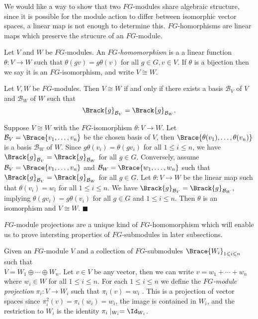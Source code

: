 \documentclass[../Project.tex]{subfiles}
\begin{document}
We would like a way to show that two $FG$-modules share algebraic structure, since it is possible for the module action to differ between isomorphic vector spaces, a linear map is not enough to determine this. $FG$-homorphisms are linear maps which preserve the strucure of an $FG$-module.
\begin{defi}
	Let  $V$ and $W$ be $FG$-modules. An \textit{$FG$-homomorphism} is a a linear function $\theta : V \to W$ such that $\theta(gv) = g\theta(v)$ for all $g \in G, v \in V$. If $\theta$ is a bijection then we say it is an $FG$-isomorphism, and write $V \cong W$.
\end{defi}


\begin{prop}[{\cite[Fact 7.7]{2}}]
\label{6}
Let $V,W$ be $FG$-modules. Then $V \cong W$ if and only if there exists a basis $\mathcal{B}_V$ of $V$ and $\mathcal{B}_W$ of $W$ such that
$$\Brack{g}_{\mathcal{B}_V} = \Brack{g}_{\mathcal{B}_W}.$$
\end{prop}
\begin{proo*}[{\cite[Fact 7.7]{2}}]
	Suppose $V \cong W$ with the $FG$-isomorphism $\theta : V \to W$. Let $\mathcal{B}_V = \Brace{v_1,\dots,v_n}$ be the chosen basis of $V$, then $\Brace{\theta(v_1),\dots,\theta(v_n)}$ is a basis $\mathcal{B}_W$ of $W$. Since $g\theta(v_i) = \theta(gv_i)$ for all $1 \leqslant i \leqslant n$, we have $\Brack{g}_{\mathcal{B}_V} = \Brack{g}_{\mathcal{B}_W}$ for all $g \in G$.  Conversely, assume $\mathcal{B}_V = \Brace{v_1,\dots,v_n}$ and $\mathcal{B}_W = \Brace{w_1,\dots,w_n}$ such that  $\Brack{g}_{\mathcal{B}_V} = \Brack{g}_{\mathcal{B}_W}$ for all $g \in G$. Let $\theta : V \to W$ be the linear map such that $\theta(v_i) = w_i$ for all $1 \leqslant i \leqslant n$. We have $\Brack{g}_{\mathcal{B}_V} = \Brack{g}_{\mathcal{B}_W}$, implying $\theta(gv_i) = g \theta(v_i)$ for all $g \in G$ and $1 \leqslant i \leqslant n$. Then $\theta$ is an isomorphism and $V \cong W$. \hfill$\blacksquare$
\end{proo*}

$FG$-module projections are a unique kind of $FG$-homomorphism which will enable us to prove intersting properties of $FG$-submodules in later subsections.

\begin{defi}
	Given an $FG$-module $V$ and a collection of $FG$-submodules $\Brace{W_i}_{1 \leqslant i \leqslant n}$ such that \\$V = W_1 \oplus \cdots \oplus W_n$. Let $v \in V$ be any vector, then we can write $v = w_1 + \cdots + w_n$ where $w_i \in W$ for all $1 \leqslant i \leqslant n$. For each $1 \leqslant i \leqslant n$ we define the \textit{$FG$-module projection} $\pi_i : V \to W_i$ such that $\pi_i(v) = w_i$ . This is a projection of vector spaces since $\pi_i^2(v) = \pi_i(w_i) = w_i$, the image is contained in $W_i$, and the restriction to $W_i$ is the identity $\pi_i\mid_{W_i} = \Id_{W_i}$.
\end{defi}
\end{document}
